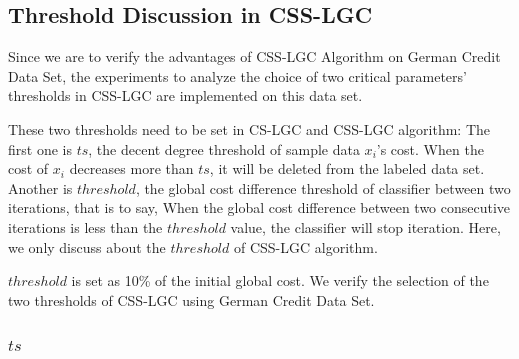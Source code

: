\documentclass{svjour3}                     %
\begin{document}
\subsection{Threshold Discussion in CSS-LGC}
Since we are to verify the advantages of CSS-LGC Algorithm on German Credit Data Set, the experiments to analyze the choice of two critical parameters' thresholds in CSS-LGC are implemented on this data set.

These two thresholds need to be set in CS-LGC and CSS-LGC algorithm: The first one is $ts$, the decent degree threshold of sample data $x_i$'s cost. When the cost of $x_i$ decreases more than $ts$, it will be deleted from the labeled data set. Another is $threshold$, the global cost difference threshold of classifier between two iterations, that is to say, When the global cost difference between two consecutive iterations is less than the $threshold$ value, the classifier will stop iteration. Here, we only discuss about the $threshold$ of CSS-LGC algorithm.

$threshold$ is set as 10\% of the initial global cost. We verify the selection of the two thresholds of CSS-LGC using German Credit Data Set.

\subsubsection{$ts$}
\end{document}
